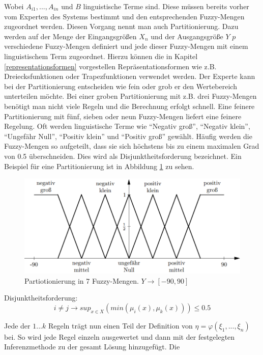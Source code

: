 \documentclass[12pt,a4paper,bibliography=totocnumbered,listof=totocnumbered]{scrartcl}
\theoremstyle{Umgebung}
\begin{document}
Wobei $A_{i1},...,A_{in}$ und $B$ linguistische Terme sind. Diese müssen bereits vorher vom Experten des Systems bestimmt und den entsprechenden Fuzzy-Mengen zugeordnet werden. Diesen Vorgang nennt man auch Partitionierung. Dazu werden auf der Menge der Eingangsgrößen $X_n$ und der Ausgangsgröße $Y$ $p$ verschiedene Fuzzy-Mengen definiert und jede dieser Fuzzy-Mengen mit einem linguistischem Term zugeordnet. Hierzu können die in Kapitel \ref{representationsformen} vorgestellen Repräsentationsformen wie z.B. Dreiecksfunktionen oder Trapezfunktionen verwendet werden. Der Experte kann bei der Partitionierung entscheiden wie fein oder grob er den Wertebereich unterteilen möchte. Bei einer groben Partitionierung mit z.B. drei Fuzzy-Mengen benötigt man nicht viele Regeln und die Berechnung erfolgt schnell. Eine feinere Partitionierung mit fünf, sieben oder neun Fuzzy-Mengen liefert eine feinere Regelung. Oft werden linguistische Terme wie \enquote{Negativ groß}, \enquote{Negativ klein}, \enquote{Ungefähr Null}, \enquote{Positiv klein} und \enquote{Positiv groß} gewählt. Häufig werden die Fuzzy-Mengen so aufgeteilt, dass sie sich höchstens bis zu einem maximalen Grad von 0.5 überschneiden. Dies wird als Disjunktheitsforderung bezeichnet. Ein Beispiel für eine Partitionierung ist in Abbildung \ref{fig:partitionierung} zu sehen.

\begin{figure}
	\centering
	\includegraphics[width=0.7\linewidth]{img/partitionierung}
	\caption{Partiotionierung in 7 Fuzzy-Mengen. $ Y \rightarrow \left[-90,90\right]$}
	\label{fig:partitionierung}
\end{figure}


\begin{defnt}
	Disjunktheitsforderung: 
	\begin{equation}
		i \neq j \rightarrow sup_{x \in X} (min(\mu_i(x), \mu_k(x))) \leq 0.5
	\end{equation}
\end{defnt}

Jede der $1...k$ Regeln trägt nun einen Teil der Definition von $\eta = \varphi(\xi_1,..., \xi_n)$ bei. So wird jede Regel einzeln ausgewertet und dann mit der festgelegten Inferenzmethode zu der gesamt Lösung hinzugefügt. Die
\end{document}
